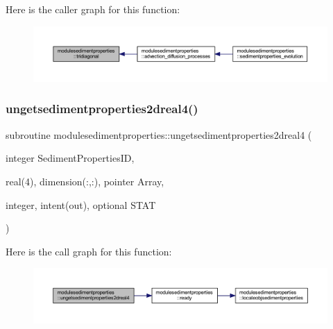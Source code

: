 Here is the caller graph for this function\+:\nopagebreak
\begin{figure}[H]
\begin{center}
\leavevmode
\includegraphics[width=350pt]{namespacemodulesedimentproperties_a36e12eab9520e6564647d977991906bf_icgraph}
\end{center}
\end{figure}
\mbox{\label{namespacemodulesedimentproperties_accb6adda15d2ee5cad20ff3f45586c73}} 
\subsubsection{\texorpdfstring{ungetsedimentproperties2dreal4()}{ungetsedimentproperties2dreal4()}}
{\footnotesize\ttfamily subroutine modulesedimentproperties\+::ungetsedimentproperties2dreal4 (\begin{DoxyParamCaption}\item[{integer}]{Sediment\+Properties\+ID,  }\item[{real(4), dimension(\+:,\+:), pointer}]{Array,  }\item[{integer, intent(out), optional}]{S\+T\+AT }\end{DoxyParamCaption})\hspace{0.3cm}{\ttfamily [private]}}

Here is the call graph for this function\+:\nopagebreak
\begin{figure}[H]
\begin{center}
\leavevmode
\includegraphics[width=350pt]{namespacemodulesedimentproperties_accb6adda15d2ee5cad20ff3f45586c73_cgraph}
\end{center}
\end{figure}
\mbox{\label{namespacemodulesedimentproperties_a1403cdef2dd5dd1114fbe5112f6e064b}} 
